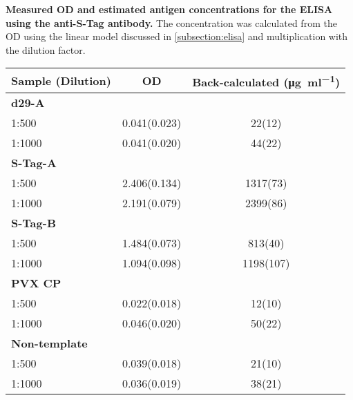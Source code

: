 \begin{supptable}[ht]
    \centering
    \caption{\textbf{Measured OD and estimated antigen concentrations for the ELISA using the anti-S-Tag antibody.} The concentration was calculated from the OD using the linear model discussed in \autoref{subsection:elisa} and multiplication with the dilution factor. }
    \label{tab:sample_values_elisa_anti_s_tag}
    \begin{tabular}{
        l
        S[table-format=1.3(2),uncertainty-mode=separate]
        S[table-format=4.0(2),uncertainty-mode=separate]
    }
    \toprule
    {\textbf{Sample (Dilution)}} &
    {\textbf{OD}} &
    {\textbf{Back-calculated (\si{\micro\gram\per\milli\litre})}} \\
    \midrule
    \textbf{d29-A} \\
    1:500 & 0.041(0.023) & 22(12) \\
    1:1000 & 0.041(0.020) & 44(22) \\
    \textbf{S-Tag-A} \\
    1:500 & 2.406(0.134) & 1317(73) \\
    1:1000 & 2.191(0.079) & 2399(86) \\
    \textbf{S-Tag-B} \\
    1:500 & 1.484(0.073) & 813(40) \\
    1:1000 & 1.094(0.098) & 1198(107) \\
    \textbf{PVX CP} \\
    1:500 & 0.022(0.018) & 12(10) \\
    1:1000 & 0.046(0.020) & 50(22) \\
    \textbf{Non-template} \\
    1:500 & 0.039(0.018) & 21(10) \\
    1:1000 & 0.036(0.019) & 38(21) \\
    \bottomrule
    \end{tabular}
\end{supptable}

